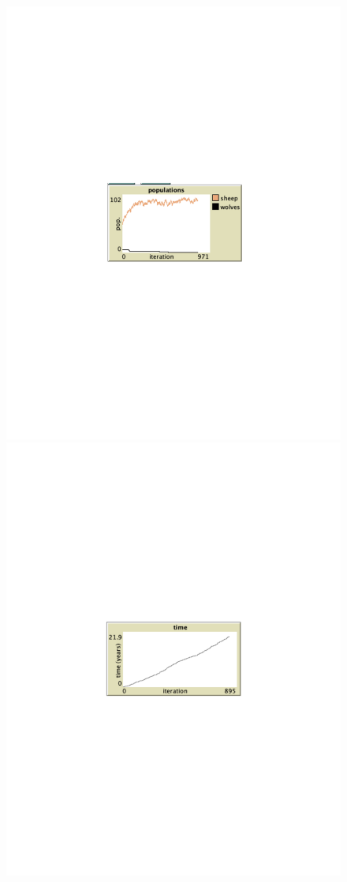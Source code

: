 \documentclass[11pt, oneside]{article}   	%
\begin{document}
\begin{enumerate}
\begin{figure}
\centering
\begin{minipage}{.5\textwidth}
  \centering
  \includegraphics[width=.8\linewidth]{populations}
\end{minipage}%
\begin{minipage}{.5\textwidth}
  \centering
  \includegraphics[width=.7\linewidth]{time}
\end{minipage}
\end{figure}
\FloatBarrier


\end{enumerate}
\end{document}
